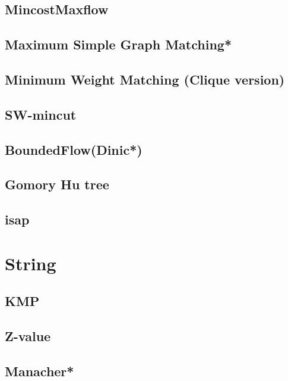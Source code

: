 \subsection{MincostMaxflow}

\subsection{Maximum Simple Graph Matching*} %

\subsection{Minimum Weight Matching (Clique version)}

\subsection{SW-mincut}

\subsection{BoundedFlow(Dinic*)} %

\subsection{Gomory Hu tree}

\subsection{isap}



\section{String}
\subsection{KMP}

\subsection{Z-value}

\subsection{Manacher*} %

